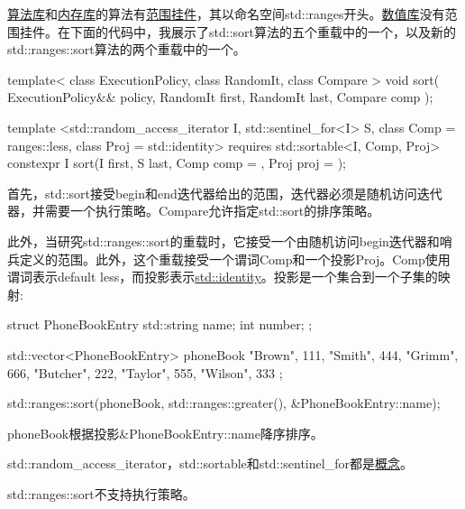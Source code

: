 \href{https://en.cppreference.com/w/cpp/header/algorithm}{算法库}和\href{https://en.cppreference.com/w/cpp/header/memory}{内存库}的算法有\href{https://en.cppreference.com/w/cpp/algorithm/ranges}{范围挂件}，其以命名空间std::ranges开头。\href{https://en.cppreference.com/w/cpp/header/numeric}{数值库}没有范围挂件。在下面的代码中，我展示了std::sort算法的五个重载中的一个，以及新的std::ranges::sort算法的两个重载中的一个。

\begin{cpp}
template< class ExecutionPolicy, class RandomIt, class Compare >
void sort( ExecutionPolicy&& policy,
		   RandomIt first, RandomIt last, Compare comp );

template <std::random_access_iterator I, std::sentinel_for<I> S,
		class Comp = ranges::less, class Proj = std::identity>
requires std::sortable<I, Comp, Proj>
constexpr I sort(I first, S last, Comp comp = {}, Proj proj = {});
\end{cpp}

首先，std::sort接受begin和end迭代器给出的范围，迭代器必须是随机访问迭代器，并需要一个执行策略。Compare允许指定std::sort的排序策略。

此外，当研究std::ranges::sort的重载时，它接受一个由随机访问begin迭代器和哨兵定义的范围。此外，这个重载接受一个谓词Comp和一个投影Proj。Comp使用谓词表示default less，而投影表示\href{https://en.cppreference.com/w/cpp/utility/functional/identity}{std::identity}。投影是一个集合到一个子集的映射:

\begin{cpp}
struct PhoneBookEntry{
	std::string name;
	int number;
};

std::vector<PhoneBookEntry> phoneBook{ {"Brown", 111}, {"Smith", 444}, {"Grimm", 666},
							{"Butcher", 222}, {"Taylor", 555}, {"Wilson", 333} };
							
std::ranges::sort(phoneBook, std::ranges::greater(), &PhoneBookEntry::name);
\end{cpp}

phoneBook根据投影\&PhoneBookEntry::name降序排序。

std::random\_access\_iterator，std::sortable和std::sentinel\_for都是\href{https://www.modernescpp.com/index.php/tag/concepts}{概念}。

std::ranges::sort不支持执行策略。



































